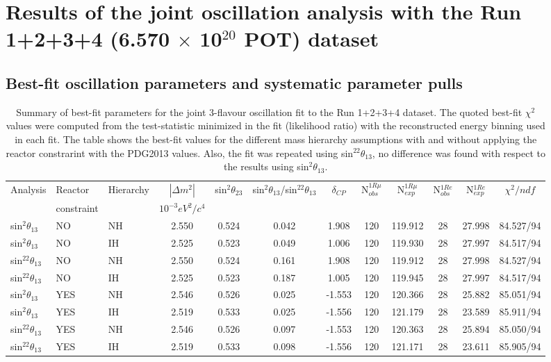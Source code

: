 \section {Results of the joint oscillation analysis with the Run 1+2+3+4 (6.570 $\times$ 10$^{20}$ POT) dataset}
\label{sec:results}

\subsection {Best-fit oscillation parameters and systematic parameter pulls}
\label{sec:results_bestfit_params}


%
%
\begin{table}[htb]
\scriptsize
\centering
\begin{tabular}{| l | l | l | c  c  c  c | c  c  c  c | c  |}
\hline
Analysis & Reactor & Hierarchy &
$|\Delta m^{2}|$ & sin$^2\theta_{23}$ & sin$^2\theta_{13}$/sin$^22\theta_{13}$ & $\delta_{CP}$ & 
N$_{obs}^{1R\mu}$ & N$_{exp}^{1R\mu}$ & 
N$_{obs}^{1Re}$ & N$_{exp}^{1Re}$ & 
$\chi^2/ndf$ \\
 &  constraint & & $10^{-3} eV^{2}/c^{4}$ & & & & & & & & \\
\hline
     sin$^2\theta_{13}$ & NO  & NH  & 2.550 & 0.524 & 0.042 & 1.908 &    120 & 119.912 & 28 & 27.998 &  84.527/94\\
\hline
	sin$^2\theta_{13}$ & NO  & IH  & 2.525 & 0.523 & 0.049 & 1.006 &    120 & 119.930 & 28 & 27.997 &  84.517/94\\
\hline 
	sin$^22\theta_{13}$ & NO  & NH  & 2.550 & 0.524 & 0.161 & 1.908 &    120 & 119.912 & 28 & 27.998 &  84.527/94\\
\hline
	sin$^22\theta_{13}$ & NO  & IH  & 2.525 & 0.523 & 0.187 & 1.005 &    120 & 119.945 & 28 & 27.997 &  84.517/94\\
\hline \hline
 sin$^2\theta_{13}$ & YES  & NH  & 2.546 & 0.526 & 0.025 & -1.553 &    120 & 120.366 & 28 & 25.882 &  85.051/94\\
\hline
 sin$^2\theta_{13}$ & YES  & IH  & 2.519 & 0.533 & 0.025 & -1.556 &    120 & 121.179 & 28 & 23.589 &  85.911/94\\
\hline
 sin$^22\theta_{13}$ & YES  & NH  & 2.546 & 0.526 & 0.097 & -1.553 &    120 & 120.363 & 28 & 25.894 &  85.050/94\\
\hline
 sin$^22\theta_{13}$ & YES  & IH  & 2.519 & 0.533 & 0.098 & -1.556 &    120 & 121.171 & 28 & 23.611 &  85.905/94\\
\hline
\end{tabular}
\caption{
  Summary of best-fit parameters for the joint 3-flavour oscillation fit
  to the Run 1+2+3+4 dataset.
  The quoted best-fit $\chi^2$ values were computed from the test-statistic minimized in the fit (likelihood ratio)
  with the reconstructed energy binning used in each fit.
  The table shows the best-fit values for the different mass hierarchy assumptions with and without applying the reactor constrarint with the PDG2013 values. Also, the fit was repeated using sin$^22\theta_{13}$, no difference was found with respect to the results using sin$^2\theta_{13}$.
}
\label{tab:data_fits:best_fit_values}
\end{table}
